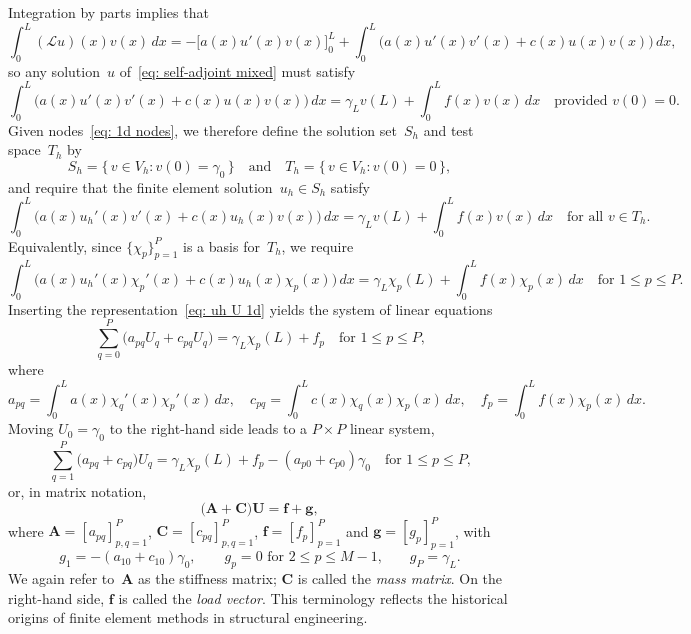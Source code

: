 Integration by parts implies that
\begin{equation}\label{eq: Lu v by parts}
\int_0^L(\mathcal{L}u)(x)v(x)\,dx
    =-\bigl[a(x)u'(x)v(x)\bigr]_0^L+\int_0^L\bigl(a(x)u'(x)v'(x)+c(x)u(x)v(x)
        \bigr)\,dx,
\end{equation}
so any solution~$u$ of~\eqref{eq: self-adjoint mixed} must satisfy
\begin{equation}\label{eq: Lu=f weak 1d}
\int_0^L\bigl(a(x)u'(x)v'(x)+c(x)u(x)v(x)\bigr)\,dx
    =\gamma_Lv(L)+\int_0^Lf(x)v(x)\,dx
    \quad\text{provided $v(0)=0$.}
\end{equation}
Given nodes~\eqref{eq: 1d nodes}, we therefore define the solution set~$S_h$ 
and test space~$T_h$ by
\[
S_h=\{\,v\in V_h:v(0)=\gamma_0\,\}
\quad\text{and}\quad
T_h=\{\,v\in V_h:v(0)=0\,\},
\]
and require that the finite element solution~$u_h\in S_h$ satisfy
\begin{equation}\label{eq: self-adjoint mixed bc FEM}
\int_0^L\bigl(a(x)u_h'(x)v'(x)+c(x)u_h(x)v(x)\bigr)\,dx
    =\gamma_Lv(L)+\int_0^Lf(x)v(x)\,dx
    \quad\text{for all $v\in T_h$.}
\end{equation}
Equivalently, since $\{\chi_p\}_{p=1}^P$ is a basis for~$T_h$, we require
\[
\int_0^L\bigl(a(x)u_h'(x)\chi_p'(x)+c(x)u_h(x)\chi_p(x)\bigr)\,dx
    =\gamma_L\chi_p(L)+\int_0^Lf(x)\chi_p(x)\,dx
    \quad\text{for $1\le p\le P$.}
\]
Inserting the representation~\eqref{eq: uh U 1d} yields the system of linear 
equations
\[
\sum_{q=0}^P\bigl(a_{pq}U_q+c_{pq}U_q\bigr)=\gamma_L\chi_p(L)+f_p
    \quad\text{for $1\le p\le P$,}
\]
where
\[
a_{pq}=\int_0^La(x)\chi_q'(x)\chi_p'(x)\,dx,\quad
c_{pq}=\int_0^Lc(x)\chi_q(x)\chi_p(x)\,dx,\quad
f_p=\int_0^Lf(x)\chi_p(x)\,dx.
\]
Moving $U_0=\gamma_0$ to the right-hand side leads to a $P\times P$ linear 
system,
\[
\sum_{q=1}^P\bigl(a_{pq}+c_{pq})U_q
    =\gamma_L\chi_p(L)+f_p-(a_{p0}+c_{p0})\gamma_0
    \quad\text{for $1\le p\le P$,}
\]
or, in matrix notation,
\begin{equation}\label{eq: self-adjoint mixed equations}
\bigl(\boldsymbol{A}+\boldsymbol{C}\bigr)\boldsymbol{U}
    =\boldsymbol{f}+\boldsymbol{g},
\end{equation}
where $\boldsymbol{A}=[a_{pq}]_{p,q=1}^P$, $\boldsymbol{C}=[c_{pq}]_{p,q=1}^P$,
$\boldsymbol{f}=[f_p]_{p=1}^P$ and $\boldsymbol{g}=[g_p]_{p=1}^P$, with
\[
g_1=-(a_{10}+c_{10})\gamma_0,\qquad
\text{$g_p=0$ for $2\le p\le M-1$,}\qquad
g_P=\gamma_L.
\]
We again refer to~$\boldsymbol{A}$ as the stiffness matrix;
$\boldsymbol{C}$ is called the \emph{mass matrix}.  On the right-hand side, 
$\boldsymbol{f}$ is called the \emph{load vector}.  This terminology reflects 
the historical origins of finite element methods in structural engineering.

